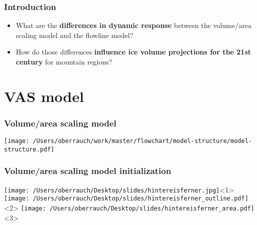 \documentclass[12pt, aspectratio=169, abstract=off, oneside]{beamer}
\begin{document}
    \begin{frame}[c]\frametitle{Introduction}
        \centering
        \Large
        \vspace*{0.5cm}
        \begin{itemize}
            \item<1> What are the \textbf{differences in dynamic response} between the volume/area scaling model and the flowline model?
            \vspace*{0.2cm}
            \item<2> How do those differences \textbf{influence ice volume projections for the 21st century} for mountain regions?
            \vspace*{0.2cm}
        \end{itemize}
    
    \end{frame}



\section{VAS model} %
\label{sec:vas_model}

    \begin{frame}[c]\frametitle{Volume/area scaling model}

        \centering
        \texttt{[image: /Users/oberrauch/work/master/flowchart/model-structure/model-structure.pdf]}
    
    \end{frame}
    
    \begin{frame}[t]\frametitle{Volume/area scaling model initialization}

        \centering
        \texttt{[image: /Users/oberrauch/Desktop/slides/hintereisferner.jpg]}<1>%
        \texttt{[image: /Users/oberrauch/Desktop/slides/hintereisferner\_outline.pdf]}<2>%
        \texttt{[image: /Users/oberrauch/Desktop/slides/hintereisferner\_area.pdf]}<3>%
    
    \end{frame}
\end{document}
